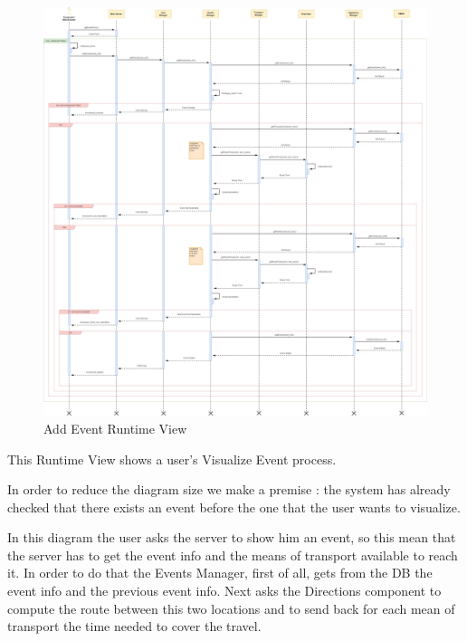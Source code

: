 \begin{figure}[H]
	\centering
	\includegraphics[scale=0.15]{Images/Runtime/Add_Event}
	\caption{Add Event Runtime View}
\end{figure}

This Runtime View shows a user's Visualize Event process.\par
In order to reduce the diagram size we make a premise : the system has already checked that there exists an event before the one that the user wants to visualize.\par
In this diagram the user asks the server to show him an event, so this mean that the server has to get the event info and the means of transport available to reach it. In order to do that the Events Manager, first of all, gets from the DB the event info and the previous event info. Next asks the Directions component to compute the route between this two locations and to send back for each mean of transport the time needed to cover the travel.
 
